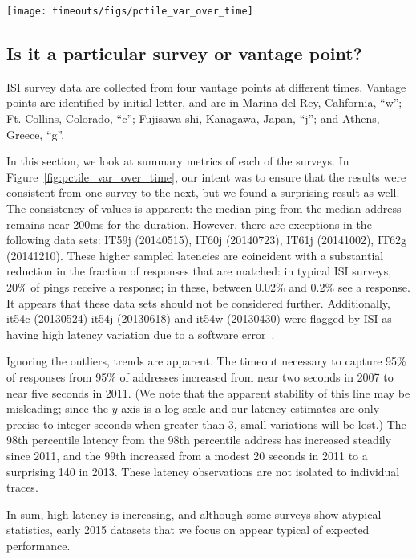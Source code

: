 \begin{figure*}
  \begin{center}
  \texttt{[image: timeouts/figs/pctile\_var\_over\_time]}
  \end{center}
  \caption[A longitudinal view of RTTs in ISI surveys]{\label{fig:pctile_var_over_time}Top: Minimum timeout
    required to capture the $c^{th}$ percentile latency
    sample from the $c^{th}$ percentile address in each
    survey, organized by time.  Each point represents the
    timeout required to capture, e.g., 95\% of the responses
    from 95\% of the addresses.  The 1\% line is indicative
    of the minimum.  Bottom: Response rate for each survey;
    symbols represent which vantage point was used.  Surveys
    from Japan with very few successes are not plotted on
    the top graph.}
\end{figure*}


\subsection{Is it a particular survey or vantage point?}

ISI survey data are collected from four vantage points at
different times.  Vantage points are identified by initial
letter, and are in Marina del Rey,
California, ``w''; Ft. Collins, Colorado, ``c''; Fujisawa-shi, Kanagawa,
Japan, ``j''; and Athens, Greece, ``g''.  

In this section, we look at summary metrics of each of the
surveys.  In Figure~\ref{fig:pctile_var_over_time}, our
intent was to ensure that the results were consistent from
one survey to the next, but we found a surprising result as
well.  The consistency of values is apparent: the median
ping from the median address remains near 200ms for the
duration.  However, there are exceptions in the following
data sets: IT59j (20140515), IT60j (20140723), IT61j
(20141002), IT62g (20141210). 
These
higher sampled latencies are coincident with a substantial
reduction in the fraction of responses that are matched: in
typical ISI surveys, 20\% of pings receive a response; in
these, between 0.02\% and 0.2\% see a response.  It appears
that these data sets should not be considered further.
Additionally, it54c (20130524) it54j (20130618) and it54w (20130430)
were flagged by ISI as having high latency variation due to 
a software error~\cite{isi-notes-54}.

Ignoring the outliers, trends are apparent.  The timeout
necessary to capture 95\% of responses from 95\% of
addresses increased from near two seconds in 2007 to near
five seconds in 2011.  (We note that the apparent stability
of this line may be misleading; since the $y$-axis is a log
scale and our latency estimates are only precise to integer
seconds when greater than 3, small variations will be lost.)
The 98th percentile latency from the 98th percentile address
has increased steadily since 2011, and the 99th increased
from a modest 20 seconds in 2011 to a surprising 140 in
2013.  These latency observations are not isolated to
individual traces.

In sum, high latency is increasing, and although some surveys
show atypical statistics, early 2015 datasets that we focus on
appear typical of expected performance.






